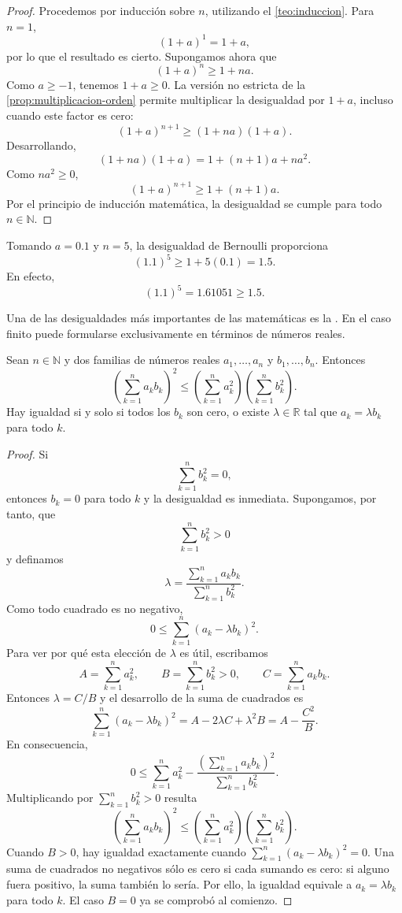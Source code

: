 \begin{proof}
Procedemos por inducción sobre $n$, utilizando el \cref{teo:induccion}. Para $n=1$,
\[
(1+a)^1=1+a,
\]
por lo que el resultado es cierto. Supongamos ahora que
\[
(1+a)^n\geq1+na.
\]
Como $a\geq-1$, tenemos $1+a\geq0$. La versión no estricta de la \cref{prop:multiplicacion-orden} permite multiplicar la desigualdad por $1+a$, incluso cuando este factor es cero:
\[
(1+a)^{n+1}\geq(1+na)(1+a).
\]
Desarrollando,
\[
(1+na)(1+a)
=
1+(n+1)a+na^2.
\]
Como $na^2\geq0$,
\[
(1+a)^{n+1}\geq1+(n+1)a.
\]
Por el principio de inducción matemática, la desigualdad se cumple para todo $n\in\mathbb{N}$.
\end{proof}

\begin{example}
Tomando $a=0.1$ y $n=5$, la desigualdad de Bernoulli proporciona
\[
(1.1)^5\geq1+5(0.1)=1.5.
\]
En efecto,
\[
(1.1)^5=1.61051\geq1.5.
\]
\end{example}

Una de las desigualdades más importantes de las matemáticas es la . En el caso finito puede formularse exclusivamente en términos de números reales.

\begin{samepage}
\begin{proposition}
\label{prop:cauchy-schwarz}
Sean $n\in\mathbb{N}$ y dos familias de números reales $a_1,\ldots,a_n$ y $b_1,\ldots,b_n$. Entonces
\[
\left(\sum_{k=1}^{n}a_kb_k\right)^2
\leq
\left(\sum_{k=1}^{n}a_k^2\right)
\left(\sum_{k=1}^{n}b_k^2\right).
\]
Hay igualdad si y solo si todos los $b_k$ son cero, o existe $\lambda\in\mathbb{R}$ tal que $a_k=\lambda b_k$ para todo $k$.
\end{proposition}
\end{samepage}

\begin{proof}
Si
\[
\sum_{k=1}^{n}b_k^2=0,
\]
entonces $b_k=0$ para todo $k$ y la desigualdad es inmediata. Supongamos, por tanto, que
\[
\sum_{k=1}^{n}b_k^2>0
\]
y definamos
\[
\lambda=
\frac{\displaystyle\sum_{k=1}^{n}a_kb_k}
{\displaystyle\sum_{k=1}^{n}b_k^2}.
\]
Como todo cuadrado es no negativo,
\[
0\leq\sum_{k=1}^{n}(a_k-\lambda b_k)^2.
\]
Para ver por qué esta elección de $\lambda$ es útil, escribamos
\[
A=\sum_{k=1}^n a_k^2,\qquad B=\sum_{k=1}^n b_k^2>0,
\qquad C=\sum_{k=1}^n a_kb_k.
\]
Entonces $\lambda=C/B$ y el desarrollo de la suma de cuadrados es
\[
\sum_{k=1}^n(a_k-\lambda b_k)^2
=A-2\lambda C+\lambda^2B
=A-\frac{C^2}{B}.
\]
En consecuencia,
\[
0\leq
\sum_{k=1}^{n}a_k^2
-
\frac{\left(\sum_{k=1}^{n}a_kb_k\right)^2}
{\sum_{k=1}^{n}b_k^2}.
\]
Multiplicando por $\sum_{k=1}^{n}b_k^2>0$ resulta
\[
\left(\sum_{k=1}^{n}a_kb_k\right)^2
\leq
\left(\sum_{k=1}^{n}a_k^2\right)
\left(\sum_{k=1}^{n}b_k^2\right).
\]
Cuando $B>0$, hay igualdad exactamente cuando $\sum_{k=1}^n(a_k-\lambda b_k)^2=0$. Una suma de cuadrados no negativos sólo es cero si cada sumando es cero: si alguno fuera positivo, la suma también lo sería. Por ello, la igualdad equivale a $a_k=\lambda b_k$ para todo $k$. El caso $B=0$ ya se comprobó al comienzo.
\end{proof}

